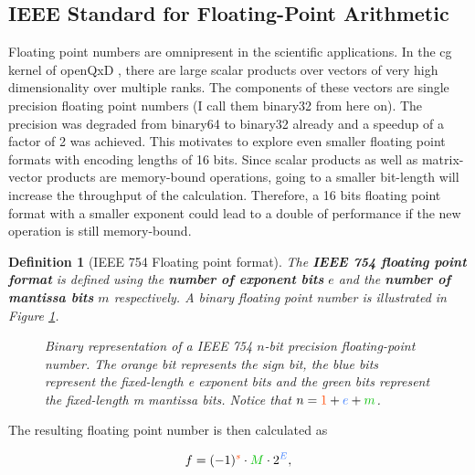 \documentclass{article}
\theoremstyle{plain} %
\newtheorem{definition}{Definition}[section]
\theoremstyle{convention} %
\theoremstyle{remark} %
\def\df#1{\textbf{\textit{#1}}}
\numberwithin{equation}{section}
\begin{document}
\subsection{IEEE Standard for Floating-Point Arithmetic}

Floating point numbers are omnipresent in the scientific applications. In the \acrfull{cg} kernel of openQxD \cite{openqxd}, there are large scalar products over vectors of very high dimensionality over multiple ranks. The components of these vectors are single precision floating point numbers (I call them \gls{binary32} from here on). The precision was degraded from \gls{binary64} to \gls{binary32} already and a speedup of a factor of 2 was achieved. This motivates to explore even smaller floating point formats with encoding lengths of 16 bits. Since scalar products as well as matrix-vector products are memory-bound operations, going to a smaller bit-length will increase the throughput of the calculation. Therefore, a 16 bits floating point format with a smaller exponent could lead to a double of performance if the new operation is still memory-bound.

\begin{definition}[IEEE 754 Floating point format]

The \df{IEEE 754 floating point format} \cite{ieee754_1985} is defined using the \df{number of exponent bits} $e$ and the \df{number of mantissa bits} $m$ respectively. A binary floating point number is illustrated in Figure \ref{fig:float}.

\begin{figure}[H]
  \caption{Binary representation of a IEEE 754 $n$-bit precision floating-point number. The \textcolor{corange}{orange} bit represents the \textcolor{corange}{sign bit}, the \textcolor{cblue}{blue} bits represent the fixed-length \textcolor{cblue}{e exponent bits} and the \textcolor{cgreen}{green} bits represent the fixed-length \textcolor{cgreen}{m mantissa bits}. Notice that $n = \textcolor{corange}{1} + \textcolor{cblue}{e} + \textcolor{cgreen}{m}$.}
  \label{fig:float}
\end{figure}

\end{definition}

The resulting floating point number is then calculated as

\begin{align*}
    f = (-1)^{\textcolor{corange}{s}} \cdot \textcolor{cgreen}{M} \cdot 2^{\textcolor{cblue}{E}},
\end{align*}
\end{document}
